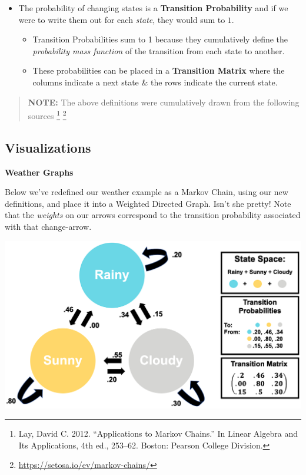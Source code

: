 \documentclass[
]{book}
\providecommand{\tightlist}{%
  \setlength{\itemsep}{0pt}\setlength{\parskip}{0pt}}
\begin{document}
\hfill\break

\begin{itemize}
\tightlist
\item
  The probability of changing states is a \textbf{Transition Probability} and if we were to write them out for each \emph{state}, they would sum to \(1\).

  \begin{itemize}
  \tightlist
  \item
    Transition Probabilities sum to 1 because they cumulatively define the \emph{probability mass function} of the transition from each state to another.
  \item
    These probabilities can be placed in a \textbf{Transition Matrix} where the columns indicate a next state \& the rows indicate the current state.
  \end{itemize}
\end{itemize}

\begin{quote}
\textbf{NOTE:} The above definitions were cumulatively drawn from the following sources \footnote{Lay, David C. 2012. ``Applications to Markov Chains.'' In Linear Algebra and Its Applications, 4th ed., 253--62. Boston: Pearson College Division.} \footnote{\url{https://setosa.io/ev/markov-chains/}}
\end{quote}

\hfill\break

\hypertarget{visualizations}{%
\subsection*{Visualizations}\label{visualizations}}

\textbf{Weather Graphs}

Below we've redefined our weather example as a Markov Chain, using our new definitions, and place it into a Weighted Directed Graph. Isn't she pretty! Note that the \emph{weights} on our arrows correspond to the transition probability associated with that change-arrow.

\includegraphics{images/HMM_Diagram_Intuition.png}
\end{document}
